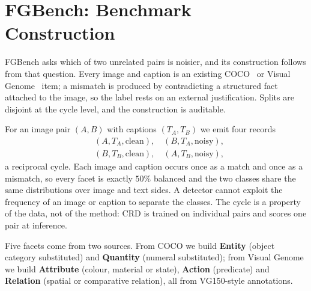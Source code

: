 \section{FGBench: Benchmark Construction}
\label{sec:fgbench}

FGBench asks which of two unrelated pairs is noisier, and its construction follows
from that question. Every image and caption is an existing COCO~\cite{lin2014coco} or
Visual Genome~\cite{krishna2017vg} item; a mismatch is produced by contradicting a
structured fact attached to the image, so the label rests on an external
justification. Splits are disjoint at the cycle level, and the construction is
auditable.

For an image pair $(A,B)$ with captions $(T_A,T_B)$ we emit four records
\begin{equation}
\begin{aligned}
  &(A,T_A,\text{clean}),\quad (B,T_A,\text{noisy}),\\
  &(B,T_B,\text{clean}),\quad (A,T_B,\text{noisy}),
\end{aligned}
\end{equation}
a reciprocal cycle. Each image and caption occurs once as a match and once as a
mismatch, so every facet is exactly $50\%$ balanced and the two classes share the
same distributions over image and text sides. A detector cannot exploit the frequency
of an image or caption to separate the classes. The cycle is a property of the data,
not of the method: CRD is trained on individual pairs and scores one pair at
inference.

Five facets come from two sources. From COCO we build \textbf{Entity} (object
category substituted) and \textbf{Quantity} (numeral substituted); from Visual Genome
we build \textbf{Attribute} (colour, material or state), \textbf{Action} (predicate)
and \textbf{Relation} (spatial or comparative relation), all from VG150-style
annotations.

